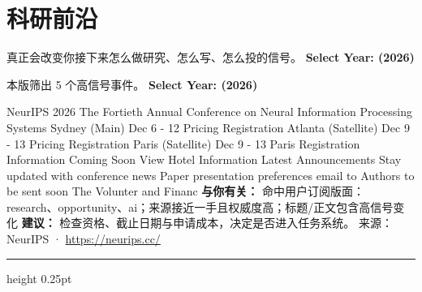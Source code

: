 \documentclass[10.5pt]{ctexart}
\begin{document}
\section*{科研前沿}
{\color{ormuted} 真正会改变你接下来怎么做研究、怎么写、怎么投的信号。}
\vspace{2mm}
{\LARGE\bfseries Select Year: (2026)}\par
\vspace{1mm}
{\color{ormuted} 本版筛出 5 个高信号事件。}
\vspace{3mm}
{\Large\bfseries Select Year: (2026)}\par
NeurIPS 2026 The Fortieth Annual Conference on Neural Information Processing Systems Sydney (Main) Dec 6 - 12 Pricing Registration Atlanta (Satellite) Dec 9 - 13 Pricing Registration Paris (Satellite) Dec 9 - 13 Paris Registration Information Coming Soon View Hotel Information Latest Announcements Stay updated with conference news Paper presentation preferences email to Authors to be sent soon The Volunter and Financ
\textbf{与你有关：} 命中用户订阅版面：research、opportunity、ai；来源接近一手且权威度高；标题/正文包含高信号变化
\textbf{建议：} 检查资格、截止日期与申请成本，决定是否进入任务系统。
{\footnotesize\color{ormuted} 来源：NeurIPS · \url{https://neurips.cc/}}
\vspace{4mm}
\hrule height 0.25pt
\vspace{3mm}
\end{document}
